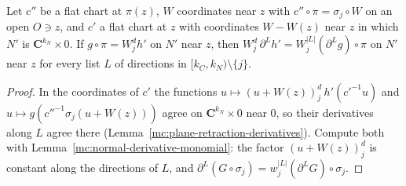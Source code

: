 \begin{lemma}
\label{mc:normal-derivative-monomial-along}
\leanok
Let \(c''\) be a flat chart at \(\pi(z)\), \(W\) coordinates near \(z\) with \(c''\circ\pi=\sigma_j\circ W\) on an open \(O\ni z\), and \(c'\) a flat chart at \(z\) with
coordinates \(W-W(z)\) near \(z\) in which \(N'\) is \(\mathbf C^{k_N}\times0\). If \(g\circ\pi=W_j^dh'\) on \(N'\) near \(z\), then
\(W_j^d\,\partial^Lh'=W_j^{|L|}(\partial^Lg)\circ\pi\) on \(N'\) near \(z\) for every list \(L\) of directions in \([k_C,k_N)\setminus\{j\}\).
\end{lemma}
\begin{proof}
\leanok
In the coordinates of \(c'\) the functions \(u\mapsto(u+W(z))_j^d\,h'(c'^{-1}u)\) and \(u\mapsto g(c''^{-1}\sigma_j(u+W(z)))\) agree on \(\mathbf C^{k_N}\times0\) near
\(0\), so their derivatives along \(L\) agree there (Lemma~\ref{mc:plane-retraction-derivatives}). Compute both with Lemma~\ref{mc:normal-derivative-monomial}: the factor
\((u+W(z))_j^d\) is constant along the directions of \(L\), and \(\partial^L(G\circ\sigma_j)=w_j^{|L|}(\partial^LG)\circ\sigma_j\).
\end{proof}

